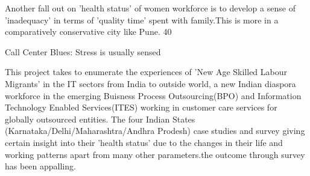 Another fall out on 'health status' of women workforce is to develop a sense of 'inadequacy' in terms of 'quality time' spent with family.This is more in a comparatively conservative city like Pune. 40%

Call Center Blues:
Stress is usually sensed 

This project takes to enumerate the experiences of 'New Age Skilled Labour Migrants' in the IT sectors from India to outside world, a new Indian diaspora  workforce in the emerging Buisness Process Outsourcing(BPO) and Information Technology Enabled Services(ITES) working in customer care services for globally outsourced entities. The four Indian States (Karnataka/Delhi/Maharashtra/Andhra Prodesh) case studies and survey giving certain insight into their 'health status' due to the changes in their life and working patterns apart from many other parameters.the outcome through survey has been appalling.

